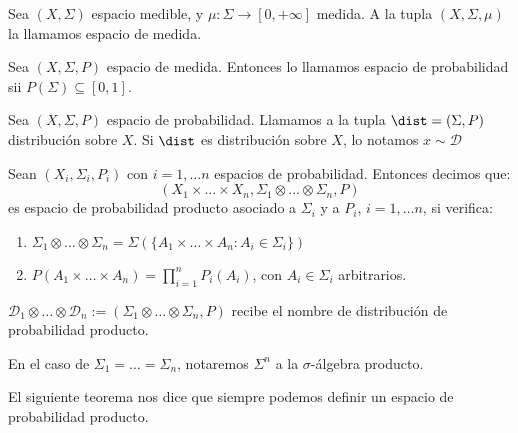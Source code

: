 \begin{definition}
 Sea $(X, \Sigma)$ espacio medible, y $\mu: \Sigma \rightarrow [0,+\infty]$ medida. A la tupla $(X, \Sigma, \mu)$ 
 la llamamos espacio de medida.
\end{definition}


\begin{definition}
 Sea $(X, \Sigma, P)$ espacio de medida. Entonces lo llamamos espacio de probabilidad sii $P(\Sigma)\subseteq [0,1]$.
\end{definition}


\begin{definition}
 Sea $(X, \Sigma, P)$ espacio de probabilidad. Llamamos a la tupla $\dist = (\Sigma,P)$ distribución sobre $X$. 
 Si $\dist$ es distribución sobre $X$, lo notamos $x\sim \mathcal{D}$
\end{definition}

\begin{definition}
 Sean $(X_i, \Sigma_i, P_i)$ con $i=1,\ldots n$ espacios de probabilidad. Entonces decimos que:
 \[(X_1 \times \ldots \times X_n, \Sigma_1 \otimes \ldots \otimes \Sigma_n, P)\] es
 espacio de probabilidad producto asociado a $\Sigma_i$ y a $P_i$, $i=1, \ldots n$, si verifica:
 
 \begin{enumerate}[i]
  \item $\Sigma_1 \otimes \ldots \otimes \Sigma_n = \Sigma\left(\{A_1 \times \ldots \times A_n: A_i\in \Sigma_i\}\right)$
  \item $P(A_1 \times \ldots \times A_n) = \prod_{i=1}^n P_i(A_i)$, con $A_i\in \Sigma_i$ arbitrarios.
 \end{enumerate}
 
 $\mathcal{D}_1 \otimes \ldots \otimes \mathcal{D}_n := (\Sigma_1 \otimes \ldots \otimes \Sigma_n, P)$ recibe 
 el nombre de distribución de probabilidad producto.
 
 En el caso de $\Sigma_1 = \ldots = \Sigma_n$, notaremos $\Sigma^n$ a la $\sigma$-álgebra producto.
\end{definition}

El siguiente teorema nos dice que siempre podemos definir un espacio de probabilidad producto.

